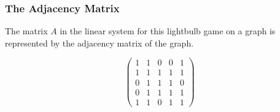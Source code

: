 \documentclass{beamer}
\newcommand{\off}{white}
\begin{document}
\begin{frame}
    \frametitle{The Adjacency Matrix}
    The matrix $A$ in the linear system for this lightbulb game on a graph is
    represented by the adjacency matrix of the graph.
    \begin{figure}
        \begin{minipage}{.5\textwidth}
            \[
                \begin{pmatrix}
                    1 & 1 & 0 & 0 & 1\\
                    1 & 1 & 1 & 1 & 1\\
                    0 & 1 & 1 & 1 & 0\\
                    0 & 1 & 1 & 1 & 1\\
                    1 & 1 & 0 & 1 & 1
                \end{pmatrix}
            \]
        \end{minipage}%
        \begin{minipage}{.5\textwidth}
            \begin{figure}[!h]
                \centering
            \end{figure}
        \end{minipage}
    \end{figure}
\end{frame}
\end{document}
